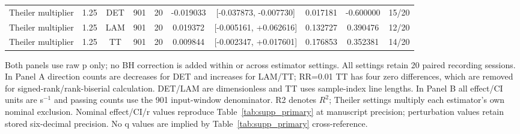 \begin{table}[p]
{\begin{tabular}{lccccccccc}
Theiler multiplier & 1.25 & DET & 901 & 20 & -0.019033 & [-0.037873, -0.007730] & 0.017181 & -0.600000 & 15/20 \\
Theiler multiplier & 1.25 & LAM & 901 & 20 & 0.019372 & [-0.005161, +0.062616] & 0.132727 & 0.390476 & 12/20 \\
Theiler multiplier & 1.25 & TT & 901 & 20 & 0.009844 & [-0.002347, +0.017601] & 0.176853 & 0.352381 & 14/20 \\
\bottomrule
\end{tabular}
}
\par\medskip
{}
\par\medskip
\begin{minipage}{\textwidth}\footnotesize
Both panels use raw p only; no BH correction is added within or across estimator settings. All settings retain 20 paired recording sessions. In Panel A direction counts are decreases for DET and increases for LAM/TT; RR=0.01 TT has four zero differences, which are removed for signed-rank/rank-biserial calculation. DET/LAM are dimensionless and TT uses sample-index line lengths. In Panel B all effect/CI units are s$^{-1}$ and passing counts use the 901 input-window denominator. R2 denotes $R^2$; Theiler settings multiply each estimator's own nominal exclusion. Nominal effect/CI/r values reproduce Table~\ref{tab:supp_primary} at manuscript precision; perturbation values retain stored six-decimal precision. No q values are implied by Table~\ref{tab:supp_primary} cross-reference.

\end{minipage}
\end{table}
